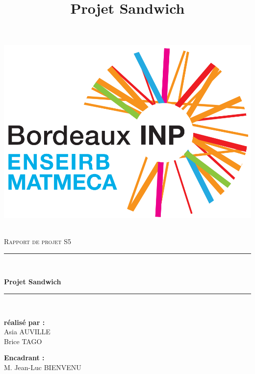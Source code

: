 \documentclass[11pt, a4paper]{article}
\begin{document}

\title{Projet Sandwich} %
\newcommand{\sujet}[1]{Rapport de projet S5} %
\newcommand{\enseignant}[1]{M. Jean-luc \textsc{BIENVENU}} %

\newcommand{\eleves}{Asia \textsc{AUVILLE}\\
Brice \textsc{TAGO}} %

\begin{center}
\includegraphics[scale=0.3]{logo.png}~\\[2cm]
\end{center}
\begin{center}
    \textsc{\Large Rapport de projet S5}\\[1.5cm]
\end{center}
     \rule{\linewidth}{0.2 mm} \\[0.6 cm]
     \begin{center}
	{\huge\bfseries Projet Sandwich}\\[0.6cm]
        \end{center}
    \rule{\linewidth}{0.2 mm} \\[1.5 cm]
	\vspace{1cm}%

    \begin{minipage}{0.4\textwidth}
      \begin{flushleft} \large
        \textbf{réalisé par : }\\
        Asia \textsc{AUVILLE}\\
        Brice \textsc{TAGO}
      \end{flushleft}
    \end{minipage}
    \begin{minipage}{0.4\textwidth}
      \begin{flushright} \large
        \textbf{Encadrant :}\\
         M. Jean-Luc \textsc{BIENVENU}\\
        
      \end{flushright}
    \end{minipage}
\end{document}
